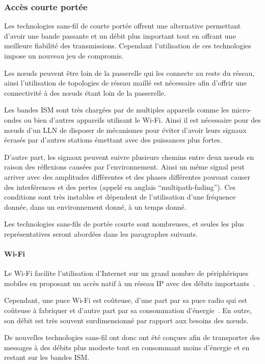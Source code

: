 \subsubsection{Accès courte portée}
\label{gw:short_range}

Les technologies sans-fil de courte portée offrent une alternative permettant d'avoir une bande passante et un débit plus important tout en offrant une meilleure fiabilité des transmissions.
Cependant l'utilisation de ces technologies impose un nouveau jeu de compromis.

Les nœuds peuvent être loin de la passerelle qui les connecte au reste du réseau, ainsi l'utilisation de topologies de réseau maillé est nécessaire afin d'offrir une connectivité à des nœuds étant loin de la passerelle.

Les bandes \ac{ISM} sont très chargées par de multiples appareils comme les micro-ondes ou bien d'autres appareils utilisant le Wi-Fi.
Ainsi il est nécessaire pour des nœuds d'un \ac{LLN} de disposer de mécanismes pour éviter d'avoir leurs signaux écrasés par d'autres stations émettant avec des puissances plus fortes.

D'autre part, les signaux peuvent suivre plusieurs chemins entre deux nœuds en raison des réflexions causées par l’environnement.
Ainsi un même signal peut arriver avec des amplitudes différentes et des phases différentes pouvant causer des interférences et des pertes (appelé en anglais ``multipath-fading'').
Ces conditions sont très instables et dépendent de l'utilisation d'une fréquence donnée, dans un environnement donné, à un temps donné.

Les technologies sans-fils de portée courte sont nombreuses, et seules les plus représentatives seront abordées dans les paragraphes suivants.

\paragraph{Wi-Fi}

Le Wi-Fi facilite l'utilisation d'Internet sur un grand nombre de périphériques mobiles en proposant un accès natif à un réseau IP avec des débits importants~\cite{lee2010mobile}.

Cependant, une puce Wi-Fi est coûteuse, d'une part par sa puce radio qui est coûteuse à fabriquer et d'autre part par sa consommation d'énergie~\cite{wifiCritic}.
En outre, son débit est très souvent surdimensionné par rapport aux besoins des nœuds.

De nouvelles technologies sans-fil ont donc ont été conçues afin de transporter des messages à des débits plus modeste tout en consommant moins d'énergie et en restant sur les bandes \ac{ISM}.

